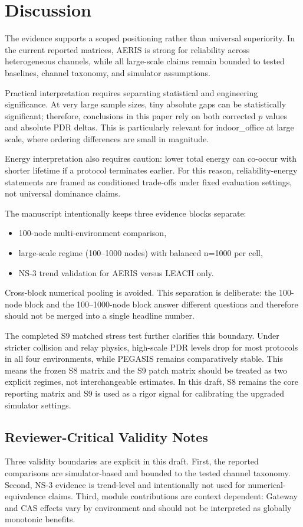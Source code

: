 \documentclass[sensors,article,submit,moreauthors,pdftex]{Definitions/mdpi}
\begin{document}
\section{Discussion}
The evidence supports a scoped positioning rather than universal superiority. In the current reported matrices, AERIS is strong for reliability across heterogeneous channels, while all large-scale claims remain bounded to tested baselines, channel taxonomy, and simulator assumptions.

Practical interpretation requires separating statistical and engineering significance. At very large sample sizes, tiny absolute gaps can be statistically significant; therefore, conclusions in this paper rely on both corrected $p$ values and absolute PDR deltas. This is particularly relevant for indoor\_office at large scale, where ordering differences are small in magnitude.

Energy interpretation also requires caution: lower total energy can co-occur with shorter lifetime if a protocol terminates earlier. For this reason, reliability-energy statements are framed as conditioned trade-offs under fixed evaluation settings, not universal dominance claims.

The manuscript intentionally keeps three evidence blocks separate:
\begin{itemize}
\item 100-node multi-environment comparison,
\item large-scale regime (100--1000 nodes) with balanced n=1000 per cell,
\item NS-3 trend validation for AERIS versus LEACH only.
\end{itemize}
Cross-block numerical pooling is avoided. This separation is deliberate: the 100-node block and the 100--1000-node block answer different questions and therefore should not be merged into a single headline number.

The completed S9 matched stress test further clarifies this boundary. Under stricter collision and relay physics, high-scale PDR levels drop for most protocols in all four environments, while PEGASIS remains comparatively stable. This means the frozen S8 matrix and the S9 patch matrix should be treated as two explicit regimes, not interchangeable estimates. In this draft, S8 remains the core reporting matrix and S9 is used as a rigor signal for calibrating the upgraded simulator settings.

\subsection*{Reviewer-Critical Validity Notes}
Three validity boundaries are explicit in this draft. First, the reported comparisons are simulator-based and bounded to the tested channel taxonomy. Second, NS-3 evidence is trend-level and intentionally not used for numerical-equivalence claims. Third, module contributions are context dependent: Gateway and CAS effects vary by environment and should not be interpreted as globally monotonic benefits.
\end{document}

